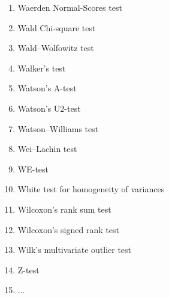 \begin{itemize}
\begin{multicols}{3}
\begin{enumerate}
			\item Waerden Normal-Scores test
			\item Wald Chi-square test
			\item Wald–Wolfowitz test
			\item Walker's test
			\item Watson's A-test
			\item Watson's U2-test
			\item Watson–Williams test
			\item Wei–Lachin test
			\item WE-test
			\item White test  for homogeneity of variances 
			\item Wilcoxon's rank sum test
			\item Wilcoxon's signed rank test
			\item Wilk's multivariate outlier test
			\item Z-test
			\item ...
		\end{enumerate}
		\end{multicols}
		

\end{itemize}
